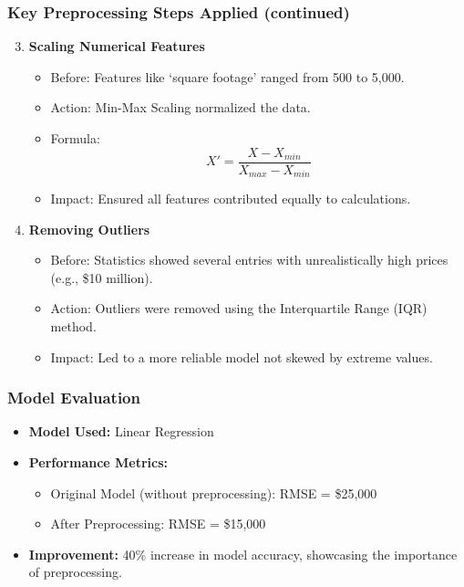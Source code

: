\documentclass[aspectratio=169]{beamer}
\begin{document}
\begin{frame}[fragile]
    \frametitle{Key Preprocessing Steps Applied (continued)}
    \begin{enumerate}
        \setcounter{enumi}{2}
        \item \textbf{Scaling Numerical Features}
            \begin{itemize}
                \item Before: Features like ‘square footage’ ranged from 500 to 5,000.
                \item Action: Min-Max Scaling normalized the data.
                \item Formula: 
                \begin{equation}
                X' = \frac{X - X_{min}}{X_{max} - X_{min}}
                \end{equation}
                \item Impact: Ensured all features contributed equally to calculations.
            \end{itemize}
        \item \textbf{Removing Outliers}
            \begin{itemize}
                \item Before: Statistics showed several entries with unrealistically high prices (e.g., \$10 million).
                \item Action: Outliers were removed using the Interquartile Range (IQR) method.
                \item Impact: Led to a more reliable model not skewed by extreme values.
            \end{itemize}
    \end{enumerate}
\end{frame}

\begin{frame}[fragile]
    \frametitle{Model Evaluation}
    \begin{itemize}
        \item \textbf{Model Used:} Linear Regression
        \item \textbf{Performance Metrics:}
            \begin{itemize}
                \item Original Model (without preprocessing): RMSE = \$25,000
                \item After Preprocessing: RMSE = \$15,000
            \end{itemize}
        \item \textbf{Improvement:} 40\% increase in model accuracy, showcasing the importance of preprocessing.
    \end{itemize}
\end{frame}
\end{document}
